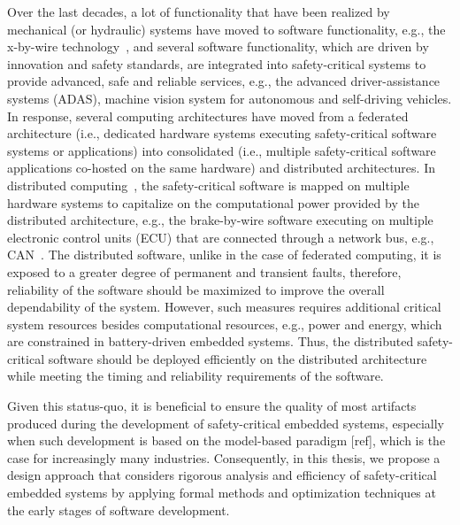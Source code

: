 Over the last decades, a lot of functionality that have been realized by mechanical (or hydraulic) systems have moved to software functionality, e.g., the x-by-wire technology~\cite{Navet2010DesignSystems}, and several software functionality, which are driven by innovation and safety standards, are integrated into safety-critical systems to provide advanced, safe and reliable services, e.g., the advanced driver-assistance systems (ADAS), machine vision system for autonomous and self-driving vehicles. In response, several computing architectures have moved from a federated architecture (i.e., dedicated hardware systems executing safety-critical software systems or applications) into consolidated (i.e., multiple safety-critical software applications co-hosted on the same hardware) and distributed architectures. In distributed computing~\cite{Kopetz2003Real-timeApplications}, the safety-critical software is mapped on multiple hardware systems to capitalize on the computational power provided by the distributed architecture, e.g., the brake-by-wire software executing on multiple electronic control units (ECU) that are connected through a network bus, e.g., CAN~\cite{Davis2007ControllerRevised}. The distributed software, unlike in the case of federated computing, it is exposed to a greater degree of permanent and transient faults, therefore, reliability of the software should be maximized to improve the overall dependability of the  system. However, such measures requires additional critical system resources besides computational resources, e.g., power and energy, which are constrained in battery-driven embedded systems. Thus, the distributed safety-critical software should be deployed efficiently on the distributed architecture while meeting the timing and reliability requirements of the software.


Given this status-quo, it is beneficial to ensure the quality of most artifacts produced during the development of safety-critical embedded systems, especially when such development is based on the model-based paradigm [ref], which is the case for increasingly many industries.  Consequently, in this thesis, we propose a design approach that considers rigorous analysis and efficiency of safety-critical embedded systems by applying formal methods and optimization techniques at the early stages of software development.
 

